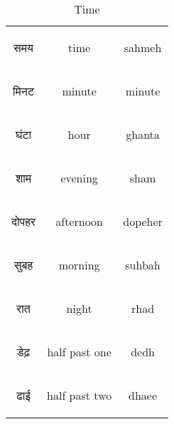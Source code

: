 \begin{table}[H]
    \centering
    \begin{tabular}{c|c|c}
\begin{hindi} समय \end{hindi} & time & sahmeh \\  
\begin{hindi} मिनट \end{hindi} & minute & minute \\  
\begin{hindi} घंटा \end{hindi} & hour & ghanta \\ 
\begin{hindi} शाम \end{hindi} & evening & sham \\ 
\begin{hindi} दोपहर \end{hindi} & afternoon & dopeher \\ 
\begin{hindi} सुबह \end{hindi} & morning & suhbah \\ 
\begin{hindi} रात \end{hindi} & night & rhad \\ 
\begin{hindi} डेढ़ \end{hindi} & half past one & dedh \\ 
\begin{hindi} ढाई \end{hindi} & half past two & dhaee \\ 
    \end{tabular}
    \caption{Time}
    \label{tab:nouns_time}
\end{table}


